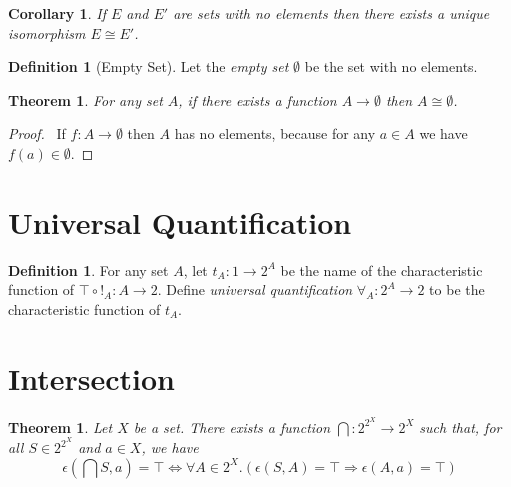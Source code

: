 \documentclass{book}
\let\qed\relax
\newtheorem{cor}{Corollary}[ax]
\newtheorem{thm}[ax]{Theorem}
\theoremstyle{definition}
\newtheorem{df}[ax]{Definition}
\begin{document}
\begin{cor}
If $E$ and $E'$ are sets with no elements then there exists a unique isomorphism $E \cong E'$.
\end{cor}

\begin{df}[Empty Set]
Let the \emph{empty set} $\emptyset$ be the set with no elements.
\end{df}

\begin{thm}
For any set $A$, if there exists a function $A \rightarrow \emptyset$ then $A \cong \emptyset$.
\end{thm}

\begin{proof}
\pf\ If $f : A \rightarrow \emptyset$ then $A$ has no elements, because for any $a \in A$ we have $f(a) \in \emptyset$. \qed
\end{proof}


\section{Universal Quantification}

\begin{df}
For any set $A$, let $t_A : 1 \rightarrow 2^A$ be the name of the characteristic function of $\top \circ !_A : A \rightarrow 2$. Define \emph{universal quantification} $\forall_A : 2^A \rightarrow 2$ to be the characteristic function of $t_A$.
\end{df}

\section{Intersection}

\begin{thm}
Let $X$ be a set. There exists a function $\bigcap : 2^{2^X} \rightarrow 2^X$ such that, for all $S \in 2^{2^X}$ and $a \in X$, we have
\[ \epsilon(\bigcap S, a) = \top \Leftrightarrow \forall A \in 2^X. (\epsilon(S,A) = \top \Rightarrow \epsilon(A,a) = \top) \]
\end{thm}
\end{document}
